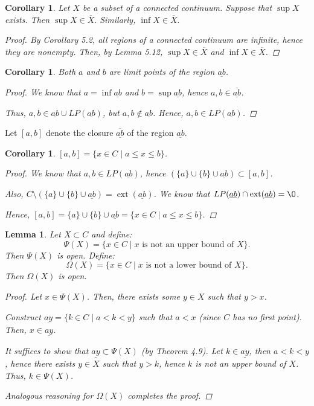 \documentclass[11pt]{article}
\renewcommand{\emptyset}{\O}
\renewcommand{\_}[1]{\underline{ #1 }}
\DeclareMathOperator{\ext}{ext}
\newtheorem{lemma}[theorem]{Lemma}
\newtheorem{corollary}[theorem]{Corollary}
\theoremstyle{definition}
\numberwithin{equation}{subsection}
\begin{document}
\begin{corollary} Let $X$ be a subset of a connected continuum. Suppose that $\sup X$ exists. Then $\sup X\in \overline{X}.$ Similarly, $\inf X\in \overline{X}.$
\begin{proof}
By Corollary 5.2, all regions of a connected continuum are infinite, hence they are nonempty. Then, by Lemma 5.12, $\sup X \in \overline{X}$ and $\inf X \in \overline{X}$.

\renewcommand\qedsymbol{QED}
\end{proof}
\end{corollary}

\begin{corollary}  Both $a$ and $b$ are limit points of the region $\underline{ab}$.
\begin{proof}
We know that $a = \inf \_{ab}$ and $b = \sup \_{ab}$, hence $a, b \in \overline{\_{ab}}$.

Thus, $a, b \in \_{ab} \cup LP(\_{ab})$, but $a,b \notin \_{ab}$. Hence, $a, b \in LP(\_{ab})$.

\renewcommand\qedsymbol{QED}
\end{proof}
\end{corollary}

Let $[a, b]$ denote the closure $\overline{\_{ab}}$ of the region $\_{ab}$.  

\begin{corollary}  $[a, b] = \{x \in C \mid a \leq x \leq b  \}$.
\begin{proof}
We know that $a,b \in LP(\_{ab})$, hence $(\{a\}\cup\{b\}\cup\_{ab}) \subset [a, b]$.

Also, $C \setminus (\{a\}\cup\{b\}\cup\_{ab}) = \ext(\_{ab})$. We know that $LP(\_{ab}) \cap \ext(\_{ab}) = \emptyset$.

Hence, $[a, b] = \{a\}\cup\{b\}\cup\_{ab} = \{x \in C \mid a \leq x \leq b  \}$.

\renewcommand\qedsymbol{QED}
\end{proof}
\end{corollary}



\begin{lemma}  Let $X \subset C$ and define:
\[
\Psi(X) = \{ x \in C \mid \text{$x$ is not an upper bound of $X$} \}.
\]
Then $\Psi(X)$ is open.
Define:
\[
\Omega(X) = \{ x \in C \mid \text{$x$ is not a lower bound of $X$} \}.
\]
Then $\Omega(X)$ is open.
\begin{proof}
Let $x \in \Psi(X)$. Then, there exists some $y \in X$ such that $y>x$. 

Construct $\_{ay} = \{k \in C \mid a < k < y \}$ such that $a<x$ (since $C$ has no first point). Then, $x \in \_{ay}$.

It suffices to show that $\_{ay} 
\subset \Psi(X)$ (by Theorem 4.9). Let $k \in \_{ay}$, then $a<k<y$, hence there exists $y \in X$ such that $y>k$, hence $k$ is not an upper bound of $X$. Thus, $k \in \Psi(X)$.

Analogous reasoning for $\Omega(X)$ completes the proof.


\renewcommand\qedsymbol{QED}
\end{proof}
\end{lemma}
\end{document}
